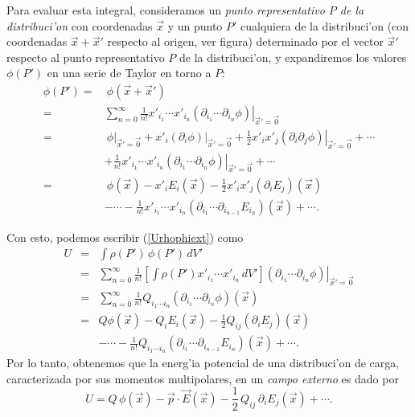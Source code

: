 Para evaluar esta integral, consideramos un \textit{punto representativo $P$ de la
distribuci'on} con coordenadas $\vec{x}$ y un punto $P'$ cualquiera de la
distribuci'on  (con coordenadas $\vec{x}+\vec{x}'$ respecto
al origen, ver figura) determinado por el vector $\vec{x}'$ respecto al punto
representativo $P$ de la distribuci'on, y expandiremos los valores $\phi(P')$ en
una serie de Taylor en torno a $P$:
\begin{align} \label{eq3.3.3}
\phi(P') = &\ \phi(\vec{x}+\vec{x}')\\
= & \sum_{n=0}^\infty\frac{1}{n!}x'_{i_1}\cdots
x'_{i_n}\left.(\partial_{i_1}\cdots\partial_{i_n}\phi)\right|_{\vec{x}'=\vec{0}} \\
= &\ \left.\phi\right|_{\vec{x}'=\vec{0}}+x'_i\left.(\partial_i\phi)\right|_{\vec{
x}'=\vec{0}}+\frac{1}{2}x'_ix'_j\left.(\partial_i\partial_j\phi)\right|_{\vec{x}
'=\vec{0}}+\cdots \nonumber\\
& +\frac{1}{n!}x'_{i_1}\cdots
x'_{i_n}\left.(\partial_{i_1}\cdots\partial_{i_n}\phi)\right|_{\vec{x}'=\vec{0}}
+\cdots\\
= &\ \phi(\vec{x})-x'_iE_i(\vec{x})-\frac{1}{2}x'_ix'_j(\partial_iE_j)(\vec{x}
) \nonumber \\
& -\cdots-\frac{1}{n!}x'_{i_1}\cdots
x'_{i_n}(\partial_{i_1}\cdots\partial_{i_{n-1}}E_{i_n})(\vec{x})+\cdots .
\end{align}

Con esto, podemos escribir (\ref{Urhophiext}) como
\begin{eqnarray}
 U&=&\int\rho(P')\,\phi(P')\,dV'\\
&=&\sum_{n=0}^\infty\frac{1}{n!}\left[\int\rho(P')x'_{i_1}\cdots
x'_{i_n}\,dV'\right]\left.(\partial_{i_1}\cdots\partial_{i_n}\phi)\right|_{\vec{x}'=\vec{0}}\\
&=&\sum_{n=0}^\infty\frac{1}{n!}Q_{i_1\cdots i_n}(\partial_{i_1}\cdots\partial_{i_n}\phi)(\vec{x})\\
&=&Q\phi(\vec{x})-Q_iE_i(\vec{x})-\frac{1}{2}
Q_{ij}(\partial_iE_j)(\vec{x}) \nonumber \\
&& -\cdots-\frac{1}{n!}Q_{i_1\cdots i_n}(\partial_{i_1}
\cdots\partial_{i_{n-1}}E_{i_n})(\vec{x})+\cdots .
\end{eqnarray}
Por lo tanto, obtenemos que la energ'ia potencial de una distribuci'on de
carga, caracterizada por sus momentos multipolares, en un \textit{campo externo}
es dado por
\begin{equation} \label{eq3.3.4}
\boxed{U=Q\,\phi(\vec{x})-\vec{p}\cdot\vec{E}(\vec{x})-\frac{1}{2}\,Q_{ij}
\,\partial_iE_j(\vec{x})+\cdots .}
\end{equation}

